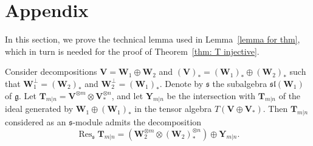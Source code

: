 \documentclass[12pt,oneside,english]{amsart}
\numberwithin{equation}{section}
\numberwithin{figure}{section}
\theoremstyle{plain}
\theoremstyle{plain}
\theoremstyle{remark}
\theoremstyle{definition}
\theoremstyle{plain}
\theoremstyle{remark}
\theoremstyle{definition}
\theoremstyle{plain}
\theoremstyle{plain}
\theoremstyle{definition}
\newcommand{\bT}{\mathbf{T}}
\newcommand{\bV}{\mathbf{V}}
\newcommand{\bY}{\mathbf{Y}}
\newcommand{\bbW}{\mathbf{W}}
\newcommand{\fg}{\mathfrak{g}}
\newcommand{\fs}{\mathfrak{s}}
\newcommand{\Res}{\operatorname{Res}}
\begin{document}

\section{Appendix}
In this section, we prove the technical lemma used in Lemma~\ref{lemma for thm}, which in turn is needed for the proof of Theorem~\ref{thm: T injective}.



Consider decompositions
$\bV=\bbW_1\oplus\bbW_2$ and $(\bV)_*=(\bbW_1)_*\oplus(\bbW_2)_*$
such that $\bbW_1^{\perp}=(\bbW_2)_*$ and $\bbW_2^{\perp}=(\bbW_1)_*$.
Denote by $\fs$
the subalgebra $\mathfrak{sl}(\bbW_1)$
of $\fg$. Let $\bT_{m|n}=\bV^{\otimes m}\otimes\bV_*^{\otimes n}$, and let
$\bY_{m|n}$  be the intersection with
$\bT_{m|n}$ of the ideal generated by
$\bbW_1\oplus(\bbW_1)_*$ in the tensor algebra $T(\bV\oplus\bV_*)$. Then $\bT_{m|n}$ considered as an $\fs$-module admits the decomposition
$$\Res_{\fs}\bT_{m|n}=(\bbW_2^{\otimes m}\otimes(\bbW_2)_*^{\otimes  n})\oplus \bY_{m|n}.$$
\end{document}
